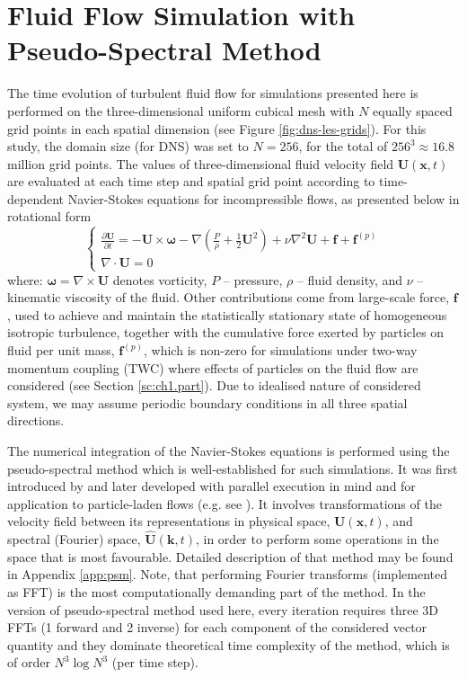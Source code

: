 \documentclass{pracamgren}
\begin{document}
\section{Fluid Flow Simulation with Pseudo-Spectral Method}
\label{sc:ch1.pspec}

The time evolution of turbulent fluid flow for simulations presented here is performed on the three-dimensional uniform cubical mesh with $N$ equally spaced grid points in each spatial dimension (see Figure \ref{fig:dns-les-grids}).
For this study, the domain size (for DNS) was set to $N=256$, for the total of $256^3 \approx 16.8$ million grid points.
The values of three-dimensional fluid velocity field $\mathbf{U}(\mathbf{x}, t)$ are evaluated at each time step and spatial grid point according to time-dependent Navier-Stokes equations for incompressible flows, as presented below in rotational form
\begin{equation}
  \left\{
  \begin{array}{ll}
  \frac{\partial \mathbf{U}}{\partial t} = - \mathbf{U} \times \boldsymbol{\omega} - \nabla \left( \frac{P}{\rho} + \frac{1}{2} \mathbf{U}^2 \right) + \nu \nabla^{2} \mathbf{U} + \mathbf{f} + \mathbf{f}^{(p)}\\
  \nabla \cdot \mathbf{U} = 0
  \end{array}
  \right.
  \label{eqn:n-s}
\end{equation}
where: $\boldsymbol{\omega} = \nabla \times \mathbf{U}$ denotes vorticity, $P$ -- pressure, $\rho$ -- fluid density, and $\nu$ -- kinematic viscosity of the fluid.
Other contributions come from large-scale force, $\mathbf{f}$, used to achieve and maintain the statistically stationary state of homogeneous isotropic turbulence, together with the cumulative force exerted by particles on fluid per unit mass, $\mathbf{f}^{(p)}$, which is non-zero for simulations under two-way momentum coupling (TWC) where effects of particles on the fluid flow are considered (see Section \ref{sc:ch1.part}).
Due to idealised nature of considered system, we may assume periodic boundary conditions in all three spatial directions.

The numerical integration of the Navier-Stokes equations is performed using the pseudo-spectral method which is well-established for such simulations.
It was first introduced by \textcite{Orszag1972} and later developed with parallel execution in mind and for application to particle-laden flows (e.g. see \textcite{Wang1993,Ayala2014,Parishani2015}).
It involves transformations of the velocity field between its representations in physical space, $\textbf{U}(\textbf{x}, t)$, and spectral (Fourier) space, $\hat{\textbf{U}}(\textbf{k}, t)$, in order to perform some operations in the space that is most favourable.
Detailed description of that method may be found in Appendix \ref{app:psm}.
Note, that performing Fourier transforms (implemented as FFT) is the most computationally demanding part of the method.
In the version of pseudo-spectral method used here, every iteration requires three 3D FFTs (1 forward and 2 inverse) for each component of the considered vector quantity and they dominate theoretical time complexity of the method, which is of order $N^3 \log N^3$ (per time step).
\end{document}
